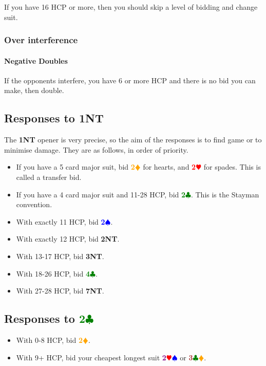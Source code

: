 \documentclass{article}
\newcommand{\Hs}{\textcolor{Red}{$\varheart$}}
\newcommand{\Ss}{\textcolor{Blue}{$\spadesuit$}}
\newcommand{\Ds}{\textcolor{Orange}{$\vardiamond$}}
\newcommand{\Cs}{\textcolor{Green}{$\clubsuit$}}
\newcommand{\NTs}{\textbf{\footnotesize{NT}}}
\renewcommand{\H}[1]{\textcolor{Red}{\textbf{#1}\Hs}}
\renewcommand{\S}[1]{\textcolor{Blue}{\textbf{#1}\Ss}}
\newcommand{\D}[1]{\textcolor{Orange}{\textbf{#1}\Ds}}
\newcommand{\C}[1]{\textcolor{Green}{\textbf{#1}\Cs}}
\newcommand{\NT}[1]{\textbf{#1\NTs}}
\newcommand{\minors}[1]{\textcolor{Brown}{\textbf{#1}}\Cs\Ds}
\newcommand{\majors}[1]{\textcolor{Purple}{\textbf{#1}}\Hs\Ss}
\begin{document}
If you have 16 HCP or more, then you should skip a level of bidding and change suit.

\subsubsection{Over interference}

\paragraph{Negative Doubles}

If the opponents interfere, you have 6 or more HCP and there is no bid you can make, then double.

\subsection{Responses to \NT{1}}

The \NT{1} opener is very precise, so the aim of the responses is to find game or to minimise damage. They are as follows, in order of priority.

\begin{itemize}
\item If you have a 5 card major suit, bid \D{2} for hearts, and \H{2} for spades. This is called a transfer bid.
\item If you have a 4 card major suit and 11-28 HCP, bid \C{2}. This is the Stayman convention.
\item With exactly 11 HCP, bid \S{2}.
\item With exactly 12 HCP, bid \NT{2}.
\item With 13-17 HCP, bid \NT{3}.
\item With 18-26 HCP, bid \C{4}.
\item With 27-28 HCP, bid \NT{7}.
\end{itemize}

\subsection{Responses to \C{2}}

\begin{itemize}
\item With 0-8 HCP, bid \D{2}.
\item With 9+ HCP, bid your cheapest longest suit \majors{2} or \minors{3}.
\end{itemize}
\end{document}
